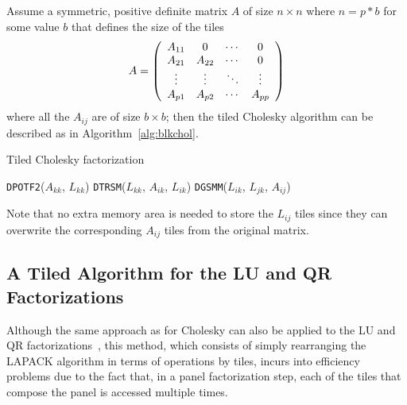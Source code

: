 \documentclass{article}
\begin{document}
Assume a symmetric, positive definite matrix $A$ of size $n \times n$
where $n=p*b$ for some value $b$ that defines the size of the tiles
\begin{displaymath}
  A=\left(
    \begin{array}[!h]{cccc}
      A_{11} & 0     & \cdots & 0     \\
      A_{21} & A_{22} & \cdots & 0     \\
      \vdots& \vdots& \ddots & \vdots\\
      A_{p1} & A_{p2} & \cdots & A_{pp} \\
    \end{array}\right)
\end{displaymath}
where all the $A_{ij}$ are of size $b \times b$; then the tiled
Cholesky algorithm can be described as in Algorithm~\ref{alg:blkchol}.

\begin{algorithm}
\caption{\label{alg:blkchol}Tiled Cholesky factorization}
  \begin{algorithmic}[1]
    \STATE \texttt{DPOTF2}($A_{kk}$, $L_{kk}$)
    \STATE \texttt{DTRSM}($L_{kk}$, $A_{ik}$, $L_{ik}$)
    \ENDFOR
    \STATE \texttt{DGSMM}($L_{ik}$, $L_{jk}$, $A_{ij}$)
    \ENDFOR
    \ENDFOR
    \ENDFOR
  \end{algorithmic}
\end{algorithm}

Note that no extra memory area is needed to store the $L_{ij}$ tiles
since they can overwrite the corresponding $A_{ij}$ tiles from the
original matrix.

\subsection{A Tiled Algorithm for the LU and QR Factorizations}

Although the same approach as for Cholesky can also be applied to the
LU and QR factorizations~\cite{670985}, this method, which consists of
simply rearranging the LAPACK algorithm in terms of operations by
tiles, incurs into efficiency problems due to the fact that, in a
panel factorization step, each of the tiles that compose the panel is
accessed multiple times. 
\end{document}
